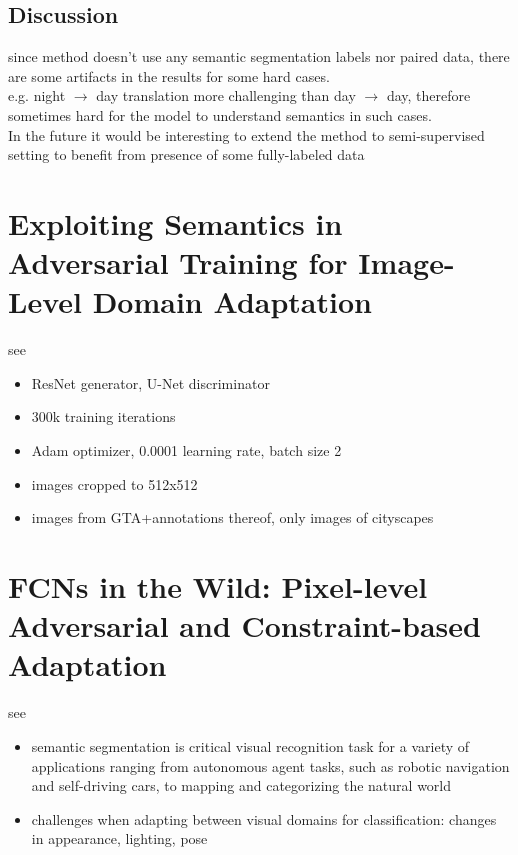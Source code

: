 \documentclass[]{article}
\begin{document}
\subsection{Discussion}
since method doesn't use any semantic segmentation labels nor paired data, there are some artifacts in the results for some hard cases.\\
e.g. night $\rightarrow$ day translation more challenging than day $\rightarrow$ day, therefore sometimes hard for the model to understand semantics in such cases.\\
In the future it would be interesting to extend the method to semi-supervised setting to benefit from presence of some fully-labeled data

\section{Exploiting Semantics in Adversarial Training for Image-Level Domain Adaptation}

see \cite{DBLP:journals/corr/abs-1810-05852}

\begin{itemize}
	\item ResNet generator, U-Net discriminator
	\item 300k training iterations
	\item Adam optimizer, 0.0001 learning rate, batch size 2
	\item images cropped to 512x512
	\item images from GTA+annotations thereof, only images of cityscapes
\end{itemize}

\section{FCNs in the Wild: Pixel-level Adversarial and Constraint-based Adaptation}

see \cite{DBLP:journals/corr/HoffmanWYD16}

\begin{itemize}
	\item semantic segmentation is critical visual recognition task for a variety of applications ranging from autonomous agent tasks, such as robotic navigation and self-driving cars, to mapping and categorizing the natural world
	\item challenges when adapting between visual domains for classification: changes in appearance, lighting, pose
\end{itemize}
\end{document}

